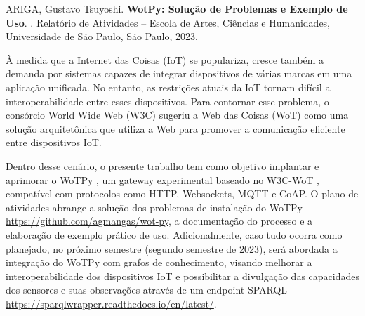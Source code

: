 
\setlength{\absparsep}{18pt} %
\begin{resumo}

% 
%
% 
%
\begin{flushleft}
ARIGA, Gustavo Tsuyoshi. \textbf{WotPy: Solução de Problemas e Exemplo de Uso}. \imprimirdata. \pageref{LastPage} Relatório de Atividades – Escola de Artes, Ciências e Humanidades, Universidade de São Paulo, São Paulo, 2023. \end{flushleft}


À medida que a Internet das Coisas (IoT) se populariza, cresce também a demanda por sistemas capazes de integrar dispositivos de várias marcas em uma aplicação unificada. No entanto, as restrições atuais da IoT tornam difícil a interoperabilidade entre esses dispositivos. Para contornar esse problema, o consórcio World Wide Web (W3C) \cite{W3CAbout} sugeriu a Web das Coisas (WoT) \cite{WoTCommunityWiki} como uma solução arquitetônica que utiliza a Web para promover a comunicação eficiente entre dispositivos IoT.

Dentro desse cenário, o presente trabalho tem como objetivo implantar e aprimorar o WoTPy \cite{GARCIAMANGAS2019235}, um gateway experimental baseado no W3C-WoT \cite{WoTArchitecture}, compatível com protocolos como HTTP, Websockets, MQTT e CoAP. O plano de atividades abrange a solução dos problemas de instalação do WoTPy \url{https://github.com/agmangas/wot-py}, a documentação do processo e a elaboração de exemplo prático de uso. Adicionalmente, caso tudo ocorra como planejado, no próximo semestre (segundo semestre de 2023), será abordada a integração do WoTPy com grafos de conhecimento, visando melhorar a interoperabilidade dos dispositivos IoT e possibilitar a divulgação das capacidades dos sensores e suas observações através de um endpoint SPARQL \url{https://sparqlwrapper.readthedocs.io/en/latest/}.


\end{resumo}
